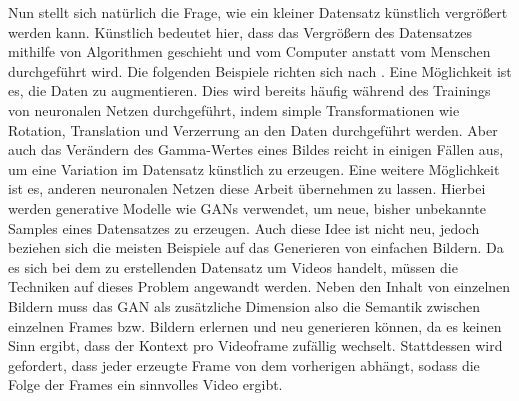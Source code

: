 Nun stellt sich natürlich die Frage, wie ein kleiner Datensatz künstlich
vergrößert werden kann. Künstlich bedeutet hier, dass das Vergrößern des
Datensatzes mithilfe von Algorithmen geschieht und vom Computer anstatt vom
Menschen durchgeführt wird. Die folgenden Beispiele richten sich nach
\cite{shorten2019}. Eine Möglichkeit ist es, die Daten zu augmentieren.  Dies
wird bereits häufig während des Trainings von neuronalen Netzen durchgeführt,
indem simple Transformationen wie Rotation, Translation und Verzerrung an den
Daten durchgeführt werden. Aber auch das Verändern des Gamma-Wertes eines Bildes
reicht in einigen Fällen aus, um eine Variation im Datensatz künstlich zu
erzeugen. Eine weitere Möglichkeit ist es, anderen neuronalen Netzen diese
Arbeit übernehmen zu lassen. Hierbei werden generative Modelle wie GANs
verwendet, um neue, bisher unbekannte Samples eines Datensatzes zu erzeugen.
Auch diese Idee ist nicht neu, jedoch beziehen sich die meisten Beispiele auf
das Generieren von einfachen Bildern. Da es sich bei dem zu erstellenden
Datensatz um Videos handelt, müssen die Techniken auf dieses Problem angewandt
werden. Neben den Inhalt von einzelnen Bildern muss das GAN als zusätzliche
Dimension also die Semantik zwischen einzelnen Frames bzw.  Bildern erlernen und
neu generieren können, da es keinen Sinn ergibt, dass der Kontext pro Videoframe
zufällig wechselt. Stattdessen wird gefordert, dass jeder erzeugte Frame von dem
vorherigen abhängt, sodass die Folge der Frames ein sinnvolles Video ergibt.

